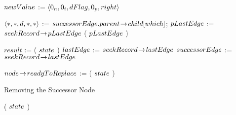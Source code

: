 \begin{limitscope}
\begin{algorithm}[!thb]
{{{				 $newValue$ := $\langle  0_n, 0_i, dFlag, 0_p, right  \rangle$ \;
	       
				 
	    }
	 
			
			
			
	 
	    
	    \BlankLine
			
			$\langle  \ast, \ast, d, \ast, \ast  \rangle$ := $successorEdge.parent \!\rightarrow\! child[which]$;
			$pLastEdge$ := $seekRecord \!\rightarrow\! pLastEdge$\;
			{
				 \HelpTargetNode( $pLastEdge$ )\;
			}
			
      \BlankLine
			
 	    $result$ := \FindSmallest( $state$ )\;
			$lastEdge$ := $seekRecord \!\rightarrow\! lastEdge$\;
			{
			   \Break\;
			} 
			\lElse
			{
			   $successorEdge$ := $seekRecord \!\rightarrow\! lastEdge$
			}

   }

   \BlankLine
	 $node \!\rightarrow\! readyToReplace$ := \True\;
   \UpdateMode( $state$ )\;
	
}

\caption{Removing the Successor Node}
\label{algo:remove}
\end{algorithm}




\begin{algorithm}[!thb]
\DefineKeyWords



\DontPrintSemicolon
\Boolean \Cleanup( $state$ )\;
\PrintSemicolon
\Begin
{
	
}
\end{algorithm}
\end{limitscope}
